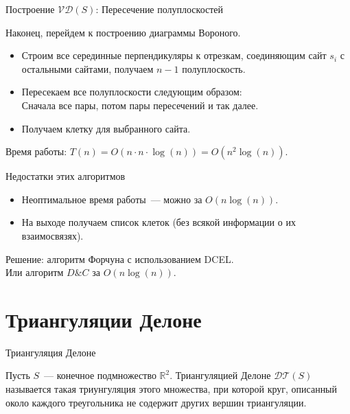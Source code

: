     \begin{frame}{Построение $\mathcal{V}\mathcal{D}(S)$: Пересечение полуплоскостей}

        Наконец, перейдем к построению диаграммы Вороного.

        \begin{itemize}

            \item Строим все серединные перпендикуляры к отрезкам, соединяющим сайт $s_i$ с остальными сайтами, получаем $n - 1$ полуплоскость.

            \item Пересекаем все полуплоскости следующим образом: \\
                  Сначала все пары, потом пары пересечений и так далее.

            \item Получаем клетку для выбранного сайта.

        \end{itemize}

        Время работы: $T(n) = O(n \cdot n \cdot \log(n)) = O(n^2 \log(n))$.

    \end{frame}

    \begin{frame}{Недостатки этих алгоритмов}

        \begin{itemize}

            \item Неоптимальное время работы~--- можно за  $O(n \log(n))$.

            \item На выходе получаем список клеток (без всякой информации о их взаимосвязях).

        \end{itemize}

        Решение: алгоритм Форчуна с использованием DCEL.\\

        Или алгоритм $D\&C$ за $O(n\log(n))$.

    \end{frame}

\section{Триангуляции Делоне}

    \begin{frame}{Триангуляция Делоне}

        \begin{defn}

            Пусть $S$~--- конечное подмножество $\mathbb{R}^2$.
            Триангуляцией Делоне  $\mathcal{D}\mathcal{T}(S)$  называется такая триунгуляция этого множества,
            при которой круг, описанный около каждого треугольника не содержит других вершин триангуляции.

        \end{defn}

    \end{frame}


